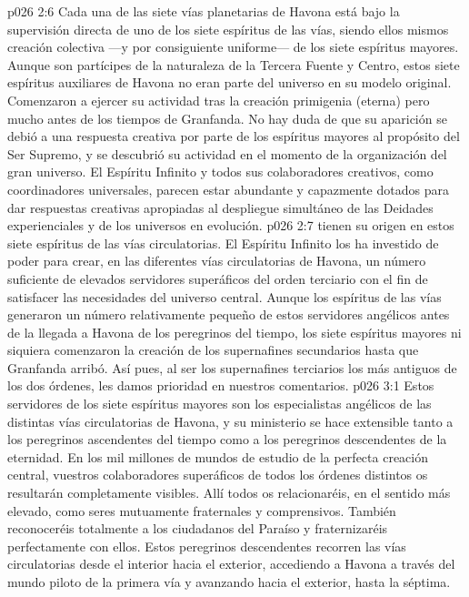 \vs p026 2:6 \pc Cada una de las siete vías planetarias de Havona está bajo la supervisión directa de uno de los siete espíritus de las vías, siendo ellos mismos creación colectiva ---y por consiguiente uniforme--- de los siete espíritus mayores. Aunque son partícipes de la naturaleza de la Tercera Fuente y Centro, estos siete espíritus auxiliares de Havona no eran parte del universo en su modelo original. Comenzaron a ejercer su actividad tras la creación primigenia (eterna) pero mucho antes de los tiempos de Granfanda. No hay duda de que su aparición se debió a una respuesta creativa por parte de los espíritus mayores al propósito del Ser Supremo, y se descubrió su actividad en el momento de la organización del gran universo. El Espíritu Infinito y todos sus colaboradores creativos, como coordinadores universales, parecen estar abundante y capazmente dotados para dar respuestas creativas apropiadas al despliegue simultáneo de las Deidades experienciales y de los universos en evolución.
\vs p026 2:7 \pc {} tienen su origen en estos siete espíritus de las vías circulatorias. El Espíritu Infinito los ha investido de poder para crear, en las diferentes vías circulatorias de Havona, un número suficiente de elevados servidores superáficos del orden terciario con el fin de satisfacer las necesidades del universo central. Aunque los espíritus de las vías generaron un número relativamente pequeño de estos servidores angélicos antes de la llegada a Havona de los peregrinos del tiempo, los siete espíritus mayores ni siquiera comenzaron la creación de los supernafines secundarios hasta que Granfanda arribó. Así pues, al ser los supernafines terciarios los más antiguos de los dos órdenes, les damos prioridad en nuestros comentarios.
\vs p026 3:1 Estos servidores de los siete espíritus mayores son los especialistas angélicos de las distintas vías circulatorias de Havona, y su ministerio se hace extensible tanto a los peregrinos ascendentes del tiempo como a los peregrinos descendentes de la eternidad. En los mil millones de mundos de estudio de la perfecta creación central, vuestros colaboradores superáficos de todos los órdenes distintos os resultarán completamente visibles. Allí todos os relacionaréis, en el sentido más elevado, como seres mutuamente fraternales y comprensivos. También reconoceréis totalmente a los ciudadanos del Paraíso y fraternizaréis perfectamente con ellos. Estos peregrinos descendentes recorren las vías circulatorias desde el interior hacia el exterior, accediendo a Havona a través del mundo piloto de la primera vía y avanzando hacia el exterior, hasta la séptima.
